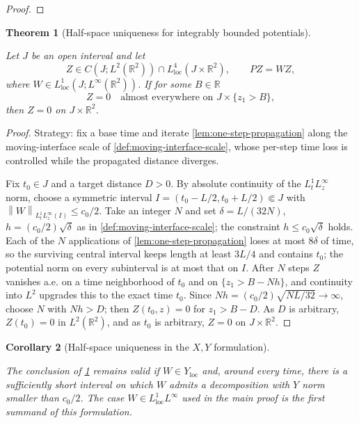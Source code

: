 \documentclass[11pt,oneside]{book}
\providecommand{\uses}[1]{}
\newtheorem{theorem}{Theorem}[chapter]
\newtheorem{corollary}[theorem]{Corollary}
\theoremstyle{definition}
\theoremstyle{remark}
\newcommand{\R}{\mathbb R}
\newcommand{\1}{\mathbf 1}
\newcommand{\loc}{\mathrm{loc}}
\newcommand{\norm}[1]{\left\lVert #1\right\rVert}
\begin{document}
\begin{proof}
\end{proof}

\begin{theorem}[Half-space uniqueness for integrably bounded potentials]\label{thm:halfspace-UC}
\uses{def:scalar-mixed-norm}
Let $J$ be an open interval and let
\[
 Z\in C(J;L^2(\R^2))\cap L^4_{\loc}(J\times\R^2),
 \qquad PZ=WZ,
\]
where $W\in L^1_{\loc}(J;L^\infty(\R^2))$. If for some $B\in\R$
\[
 Z=0\quad\text{almost everywhere on }J\times\{z_1>B\},
\]
then $Z=0$ on $J\times\R^2$.
\end{theorem}

\begin{proof}
\uses{lem:one-step-propagation, def:moving-interface-scale}
Strategy: fix a base time and iterate \cref{lem:one-step-propagation} along the moving-interface scale of \cref{def:moving-interface-scale}, whose per-step time loss is controlled while the propagated distance diverges.

Fix $t_0\in J$ and a target distance $D>0$. By absolute continuity of the $L^1_tL^\infty_z$ norm, choose a symmetric interval $I=(t_0-L/2,t_0+L/2)\Subset J$ with $\norm{W}_{L^1_tL^\infty_z(I)}\le c_0/2$. Take an integer $N$ and set $\delta=L/(32N)$, $h=(c_0/2)\sqrt\delta$ as in \cref{def:moving-interface-scale}; the constraint $h\le c_0\sqrt\delta$ holds. Each of the $N$ applications of \cref{lem:one-step-propagation} loses at most $8\delta$ of time, so the surviving central interval keeps length at least $3L/4$ and contains $t_0$; the potential norm on every subinterval is at most that on $I$. After $N$ steps $Z$ vanishes a.e. on a time neighborhood of $t_0$ and on $\{z_1>B-Nh\}$, and continuity into $L^2$ upgrades this to the exact time $t_0$. Since $Nh=(c_0/2)\sqrt{NL/32}\to\infty$, choose $N$ with $Nh>D$; then $Z(t_0,z)=0$ for $z_1>B-D$. As $D$ is arbitrary, $Z(t_0)=0$ in $L^2(\R^2)$, and as $t_0$ is arbitrary, $Z=0$ on $J\times\R^2$.

\end{proof}

\begin{corollary}[Half-space uniqueness in the $X,Y$ formulation]\label{cor:halfspace-XY}
\uses{def:carleman-spaces}
The conclusion of \cref{thm:halfspace-UC} remains valid if $W\in Y_{\loc}$ and, around every time, there is a sufficiently short interval on which $W$ admits a decomposition with $Y$ norm smaller than $c_0/2$. The case $W\in L^1_{\loc}L^\infty$ used in the main proof is the first summand of this formulation.
\end{corollary}
\end{document}

